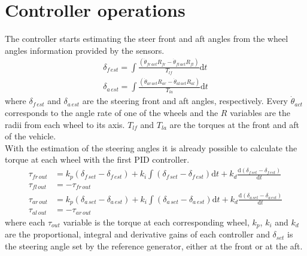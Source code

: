 \documentclass[table,xcdraw]{article}
\begin{document}
\newpage
\section{Controller operations} \label{app:controller_operations}
The controller starts estimating the steer front and aft angles from the wheel angles information provided by the sensors.
\begin{equation}
\begin{split}
    \delta_{f\,est} = \int{ \frac{(\dot{\theta}_{fr\,act}R_{fr} - \dot{\theta}_{fl\,act}R_{fl})}{T_{lf}} \textrm{d}t}\\
    \delta_{a\,est} = \int{ \frac{(\dot{\theta}_{ar\,act}R_{ar} - \dot{\theta}_{al\,act}R_{al} )} {T_{la}} \textrm{d}t}
\end{split}
\end{equation}
where $\delta_{f\,est}$ and $\delta_{a\,est}$ are the steering front and aft angles, respectively. Every $\dot{\theta}_{act}$ corresponds to the angle rate of one of the wheels and the $R$ variables are the radii from each wheel to its axis. $T_{lf}$ and $T_{la}$ are the torques at the front and aft of the vehicle.\\

With the estimation of the steering angles it is already possible to calculate the torque at each wheel with the first PID controller.
\begin{equation}
\begin{split}
    \tau_{fr\,out} & = k_p(\delta_{f\,set} - \delta_{f\,est}) + k_i\int{(\delta_{f\,set} - \delta_{f\,est})\textrm{d}t} + k_d \frac{\textrm{d}(\delta_{f\,set} - \delta_{f\,est})}{\textrm{d}t}\\
    \tau_{fl\,out} & = - \tau_{fr\,out}\\
    \tau_{ar\,out} & = k_p(\delta_{a\,set} - \delta_{a\,est}) + k_i\int{(\delta_{a\,set} - \delta_{a\,est})\textrm{d}t} + k_d \frac{\textrm{d}(\delta_{a\,set} - \delta_{a\,est})}{\textrm{d}t}\\
    \tau_{al\,out} & = - \tau_{ar\,out}
\end{split}
\end{equation}
where each $\tau_{out}$ variable is the torque at each corresponding wheel, $k_p$, $k_i$ and $k_d$ are the proportional, integral and derivative gains of each controller and $\delta_{set}$ is the steering angle set by the reference generator, either at the front or at the aft.\\
\end{document}

